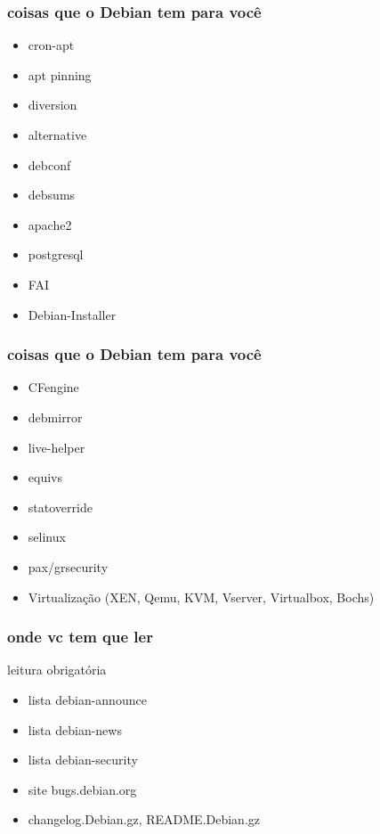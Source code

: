 \documentclass{beamer}
\begin{document}
\begin{frame}
    \frametitle{coisas que o Debian tem para você}
        \begin{block}{ }
	 \begin{itemize}
	    \item cron-apt 
	    \item apt pinning 
	    \item diversion
	    \item alternative
	    \item debconf 
	    \item debsums
	    \item apache2
	    \item postgresql
            \item FAI
	    \item Debian-Installer
        \end{itemize}
    \end{block}
\end{frame}

\begin{frame}
    \frametitle{coisas que o Debian tem para você}
        \begin{block}{ }
	 \begin{itemize}
 	   \item CFengine
	   \item debmirror
	   \item live-helper
	   \item equivs
	   \item statoverride
	   \item selinux
	   \item pax/grsecurity
	   \item Virtualização (XEN, Qemu, KVM, Vserver, Virtualbox, Bochs)
        \end{itemize}
    \end{block}
\end{frame}



\begin{frame}
    \frametitle{onde vc tem que ler}
        \begin{block}{leitura obrigatória}
	 \begin{itemize}
	    \item lista debian-announce
	    \item lista debian-news
	    \item lista debian-security
	    \item site bugs.debian.org
	    \item changelog.Debian.gz, README.Debian.gz
         \end{itemize}
    \end{block}
\end{frame}
\end{document}
